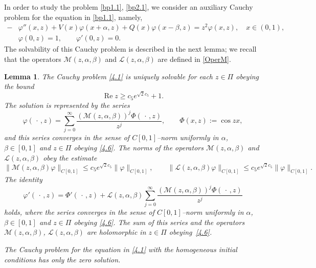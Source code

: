 \documentclass[10pt, a4paper]{article}
\theoremstyle{plain}
\newtheorem{lemma}{Lemma}
\theoremstyle{definition}
\numberwithin{equation}{section}
\def\cL{\mathcal{L}}
\DeclareMathOperator{\RE}{Re}
\begin{document}
In order to study the problem \eqref{bp1.1}, \eqref{bp2.1}, we consider an auxiliary Cauchy problem for
the equation in \eqref{bp1.1}, namely,
\begin{equation}\label{4.1}
\begin{aligned}
-&\varphi''(x, z)+ V(x)\varphi(x+\alpha, z)+Q(x)\varphi(x-\beta, z)=z^2 \varphi(x, z), \quad x\in(0, 1),
\\
&\varphi(0, z)=1, \qquad \varphi'(0, z)=0.
\end{aligned}
\end{equation}
The solvability of this  Cauchy problem is described in the next lemma; we recall that the operators
$\mathcal{M}(z,\alpha, \beta)$ and $\cL(z,\alpha, \beta)$ are defined in  \eqref{OperM}.

\begin{lemma}\label{lm4.2}
The Cauchy problem \eqref{4.1} is uniquely solvable for each $z\in\Pi$ obeying the bound
\begin{equation}\label{4.6}
\RE z\geqslant c_{5} e^{\sqrt{2}c_{5}}+1.
\end{equation}
The solution is represented by the series
\begin{equation}\label{4.7}
\varphi(\,\cdot\,, z)= \sum\limits_{j=0}^{\infty} \frac{(\mathcal{M}(z,\alpha, \beta))^j\Phi(\,\cdot\,,z)}{z^j},\qquad
\Phi(x,z):=\cos zx,
\end{equation}
and this series converges in the sense of $C[0,1]$--norm uniformly in $\alpha$, $\beta\in[0, 1]$ and $z\in\Pi$
obeying \eqref{4.6}. The norms of the operators $\mathcal{M}(z,\alpha, \beta)$ and
$\cL(z,\alpha, \beta)$ obey the estimate
\begin{equation}\label{4.13}
\|\mathcal{M}(z,\alpha, \beta)\varphi\|_{C[0, 1]}
\leqslant  c_{5} e^{\sqrt{2}c_{5}}\|\varphi\|_{C[0, 1]},\qquad
\|\cL(z,\alpha, \beta)\varphi\|_{C[0, 1]}
\leqslant  c_{5} e^{\sqrt{2}c_{5}}\|\varphi\|_{C[0, 1]}.
\end{equation}
The identity
\begin{equation}\label{4.10}
\varphi'(\,\cdot\,, z) = \Phi'(\,\cdot\,,z) +  \cL(z,\alpha, \beta)\sum\limits_{j=0}^{\infty}
\frac{(\mathcal{M}(z,\alpha, \beta))^j\Phi(\,\cdot\,,z)}{z^j}
\end{equation}
holds, where the series converges in the sense of $C[0,1]$--norm uniformly in $\alpha$, $\beta\in[0, 1]$ and
$z\in\Pi$ obeying \eqref{4.6}. The sum of this series and the operators $\mathcal{M}(z,\alpha, \beta)$,
$\cL(z,\alpha, \beta)$ are holomorphic in $z\in\Pi$ obeying~\eqref{4.6}.

The Cauchy problem for the equation in \eqref{4.1} with the homogeneous initial conditions has only the zero solution.
\end{lemma}
\end{document}

